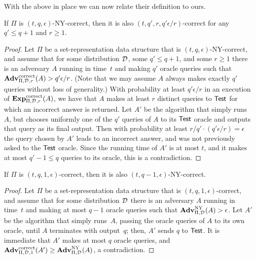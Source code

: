 With the above in place we can now relate their definition to ours.


\begin{theorem}
If $\Pi$ is $(t,q,\epsilon)$-NY-correct, then it is also
$(t, q', r, q'\epsilon/r)$-correct for any $q' \leq q+1$ and $r\geq 1$.
\end{theorem}
\begin{proof}
Let $\Pi$ be a set-representation data structure that is $(t,q,\epsilon)$-NY-correct,
and assume that for some distribution $\mathcal{D}_{}^{}$, some $q' \leq q+1$, and
some $r \geq 1$
there is an adversary $A$ running in time~$t$
and making $q'$ oracle queries such that
$\mathrm{\mathbf{Adv}}^{\mathrm{correct}}_{\Pi,\mathcal{D}_{}^{},r}(A) > q'\epsilon/r$.
(Note that
we may assume $A$ always makes exactly $q'$ queries without loss of generality.)
With probability at least
$q'\epsilon/r$ in an execution of $\mathrm{\mathbf{Exp}}^{\mathrm{correct}}_{\Pi,\mathcal{D}_{}^{},r}(A)$, we have that
$A$ makes at least $r$ distinct queries to $\mathsf{Test}$ for which
an incorrect answer is returned. Let $A'$ be the algorithm that simply
runs~$A$, but chooses
uniformly one of the $q'$ queries of $A$ to its $\mathsf{Test}$ oracle and outputs that query
as its final output. Then with probability at least $r/q' \cdot (q'\epsilon/r)=\epsilon$
the query chosen by $A'$
leads to an incorrect answer, and was not previously asked to the $\mathsf{Test}$ oracle.
Since the running time of $A'$ is at most $t$, and it makes at most $q'-1 \leq q$ queries
to its oracle, this is a contradiction.
\end{proof}


\begin{theorem}
If $\Pi$ is $(t, q, 1, \epsilon)$-correct, then it is also $(t, q-1, \epsilon)$-NY-correct.
\end{theorem}
\begin{proof}
Let $\Pi$ be a set-representation data structure that is $(t,q,1,\epsilon)$-correct,
and assume that for some distribution $\mathcal{D}_{}^{}$
there is an adversary $A$ running in time~$t$
and making at most $q-1$ oracle queries such that
$\mathrm{\mathbf{Adv}}^{\mathrm{NY}}_{\Pi,\mathcal{D}_{}^{}}(A) > \epsilon$.
Let $A'$ be the algorithm that simply
runs~$A$, passing the oracle queries of $A$ to its own oracle, until $A$ terminates
with output~$q$; then, $A'$ sends $q$ to $\mathsf{Test}$.  It is immediate that $A'$ makes at most $q$ oracle queries, and
$\mathrm{\mathbf{Adv}}^{\mathrm{correct}}_{\Pi,\mathcal{D}_{}^{},1}(A') \geq \mathrm{\mathbf{Adv}}^{\mathrm{NY}}_{\Pi,\mathcal{D}_{}^{}}(A)$, a contradiction.
\end{proof}

